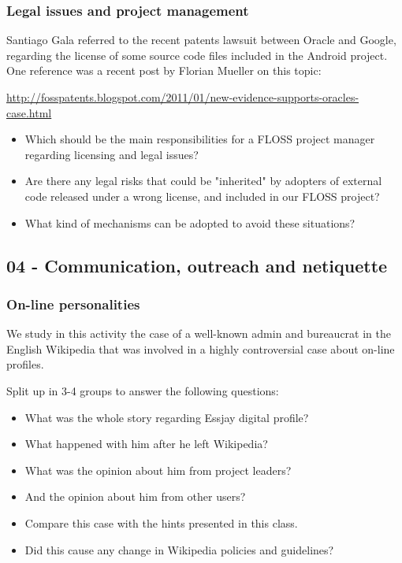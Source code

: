 \documentclass[a4paper]{article}
\begin{document}
\subsubsection{Legal issues and project management}
\label{sub:legal-manage}

Santiago Gala referred to the recent patents lawsuit between Oracle and Google, regarding the license 
of some source code files included in the Android project. One reference was a recent post by 
Florian Mueller on this topic:

\url{http://fosspatents.blogspot.com/2011/01/new-evidence-supports-oracles-case.html}

\begin{itemize}
 \item Which should be the main responsibilities for a FLOSS project manager regarding licensing and legal issues?
 \item Are there any legal risks that could be "inherited" by adopters of external code released under a wrong license, 
and included in our FLOSS project?
 \item What kind of mechanisms can be adopted to avoid these situations?
\end{itemize}

\subsection{04 - Communication, outreach and netiquette}

\subsubsection{On-line personalities}
\label{sub:on-line-personalities}

We study in this activity the case of a well-known admin and bureaucrat in the English Wikipedia that was involved in a highly
controversial case about on-line profiles.

Split up in 3-4 groups to answer the following questions:

\begin{itemize}
 \item What was the whole story regarding Essjay digital profile?
 \item What happened with him after he left Wikipedia?
 \item What was the opinion about him from project leaders?
 \item And the opinion about him from other users?
 \item Compare this case with the hints presented in this class.
 \item Did this cause any change in Wikipedia policies and guidelines?
\end{itemize}
\end{document}
